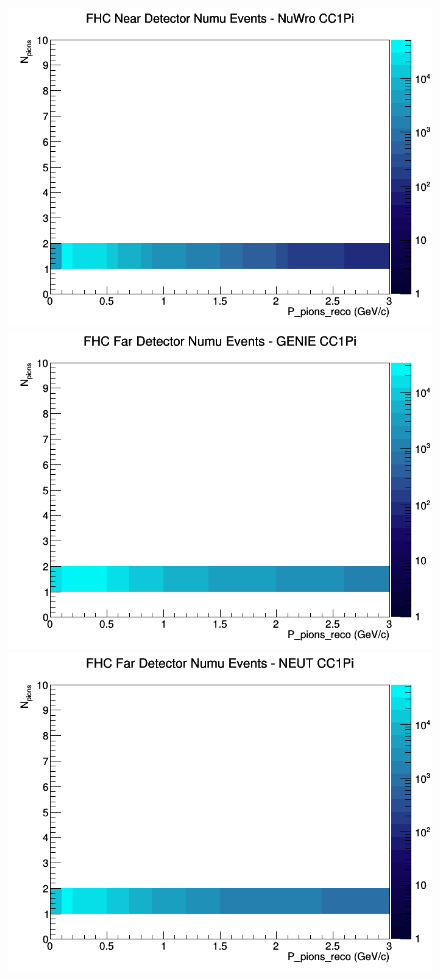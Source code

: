 \documentclass[12pt]{article}
\begin{document}
\begin{figure}[h]
\includegraphics[width=\linewidth]{eff_N_P/FGT/pions/CC1Pi_FHC_ND_numu_N_P_NuWro.png}
\endminipage
\newline
{}
\includegraphics[width=\linewidth]{eff_N_P/FGT/pions/CC1Pi_FHC_FD_numu_N_P_GENIE.png}
\endminipage
{}
\includegraphics[width=\linewidth]{eff_N_P/FGT/pions/CC1Pi_FHC_FD_numu_N_P_NEUT.png}

\end{figure}
\end{document}
